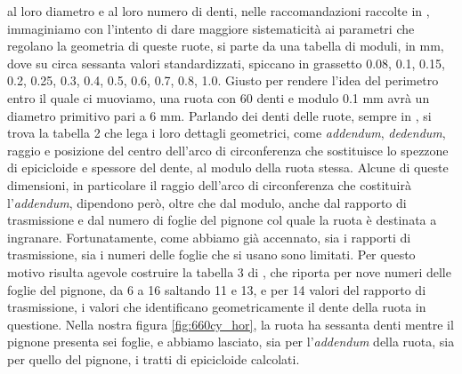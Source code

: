 al loro diametro e al  loro numero di denti, nelle raccomandazioni raccolte
in \cite{bs978}, immaginiamo
con l'intento di dare maggiore sistematicit\`a ai parametri che regolano
la geometria di queste ruote, si parte da una tabella di moduli, in mm, 
dove su circa sessanta valori standardizzati, spiccano in grassetto
0.08, 0.1, 0.15, 0.2, 0.25, 0.3, 0.4, 0.5, 0.6, 0.7, 0.8, 1.0.
Giusto per rendere l'idea del perimetro entro il quale ci muoviamo,
una ruota con 60 denti e modulo 0.1 mm avr\`a un diametro primitivo pari
a 6 mm. Parlando dei denti delle ruote, sempre in \cite{bs978}, si trova
la tabella 2 che lega i loro dettagli geometrici,
 come {\em addendum}, {\em dedendum},
raggio e posizione del centro dell'arco di circonferenza che sostituisce
lo spezzone di epicicloide e spessore del dente, al modulo
della ruota stessa.
Alcune di queste dimensioni, in particolare il raggio dell'arco
di circonferenza che costituir\`a l'{\em addendum}, dipendono per\`o, oltre che dal
modulo, anche dal rapporto di trasmissione e dal numero di foglie del
pignone col quale la ruota \`e destinata a ingranare.
Fortunatamente, come abbiamo gi\`a accennato,
sia i rapporti di trasmissione, sia i numeri delle foglie che si usano
sono limitati. Per questo motivo risulta agevole
costruire la tabella 3 di \cite{bs978},
che riporta per nove numeri delle foglie del pignone, da 6 a 16 saltando 11 e 13,
e per 14 valori del rapporto di trasmissione, i valori che identificano
geometricamente il dente della ruota in questione.
Nella nostra figura \ref{fig:660cy_hor}, la ruota ha sessanta denti mentre
il pignone presenta sei foglie, e abbiamo lasciato, sia per l'{\em addendum}
della ruota, sia per quello del pignone, i tratti di epicicloide calcolati.
